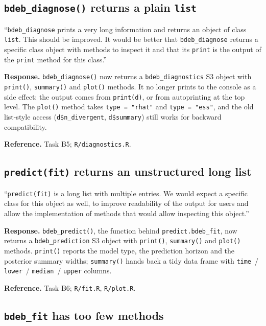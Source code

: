 \documentclass[11pt,a4paper]{article}
\newcommand{\code}[1]{\texttt{#1}}
\begin{document}
\subsection{\code{bdeb\_diagnose()} returns a plain \code{list}}

\begin{displayquote}
``\code{bdeb\_diagnose} prints a very long information and
returns an object of class \code{list}. This should be improved. It
would be better that \code{bdeb\_diagnose} returns a specific class
object with methods to inspect it and that its \code{print} is the
output of the \code{print} method for this class.''
\end{displayquote}

\textbf{Response.} \code{bdeb\_diagnose()} now returns a
\code{bdeb\_diagnostics} S3 object with \code{print()},
\code{summary()} and \code{plot()} methods. It no longer prints to the
console as a side effect: the output comes from \verb|print(d)|, or from
autoprinting at the top level. The \code{plot()} method takes
\verb|type = "rhat"| and \verb|type = "ess"|, and the old list-style
access (\verb|d$n_divergent|, \verb|d$summary|) still works for backward
compatibility.

\textbf{Reference.} Task B5; \code{R/diagnostics.R}.

\subsection{\code{predict(fit)} returns an unstructured long list}

\begin{displayquote}
``\verb|predict(fit)| is a long list with multiple entries. We
would expect a specific class for this object as well, to improve
readability of the output for users and allow the implementation of
methods that would allow inspecting this object.''
\end{displayquote}

\textbf{Response.} \code{bdeb\_predict()}, the function behind
\code{predict.bdeb\_fit}, now returns a \code{bdeb\_prediction} S3 object
with \code{print()}, \code{summary()} and \code{plot()} methods.
\code{print()} reports the model type, the prediction horizon and the
posterior summary widths; \code{summary()} hands back a tidy data frame
with \code{time}~/ \code{lower}~/ \code{median}~/ \code{upper} columns.

\textbf{Reference.} Task B6; \code{R/fit.R}, \code{R/plot.R}.

\subsection{\code{bdeb\_fit} has too few methods}
\end{document}
